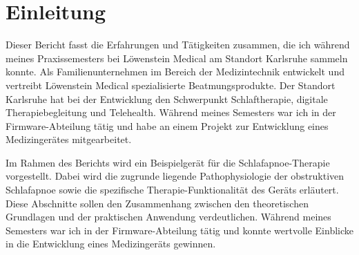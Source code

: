 \documentclass[a4paper, 12pt]{article}
\begin{document}
\newpage
\tableofcontents 


\newpage
\section{Einleitung}\label{Einleitung} 
Dieser Bericht fasst die Erfahrungen und Tätigkeiten zusammen, die ich während meines Praxissemesters bei Löwenstein Medical am Standort Karlsruhe sammeln konnte. Als Familienunternehmen im Bereich der Medizintechnik entwickelt und vertreibt Löwenstein Medical spezialisierte Beatmungsprodukte. Der Standort Karlsruhe hat bei der Entwicklung den Schwerpunkt Schlaftherapie, digitale Therapiebegleitung und Telehealth. Während meines Semesters war ich in der Firmware-Abteilung tätig und habe an einem Projekt zur Entwicklung eines Medizingerätes mitgearbeitet. 

Im Rahmen des Berichts wird ein Beispielgerät für die Schlafapnoe-Therapie vorgestellt. Dabei wird die zugrunde liegende Pathophysiologie der obstruktiven Schlafapnoe sowie die spezifische Therapie-Funktionalität des Geräts erläutert. Diese Abschnitte sollen den Zusammenhang zwischen den theoretischen Grundlagen und der praktischen Anwendung verdeutlichen. Während meines Semesters war ich in der Firmware-Abteilung tätig und konnte wertvolle Einblicke in die Entwicklung eines Medizingeräts gewinnen.
\end{document}
